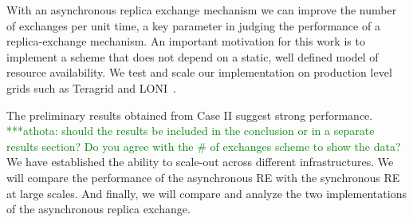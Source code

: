 \documentclass[a4paper,10pt]{article}
\newcommand{\jhanote}[1]{ {\textcolor{red} { ***shantenu: #1 }}}
\newcommand{\athotanote}[1]{ {\textcolor{green} { ***athota: #1 }}}
\newcommand{\jhanote}[1]{}
\newcommand{\athotanote}[1]{}
\begin{document}
%

With an asynchronous replica exchange mechanism we can improve the
number of exchanges per unit time, a key parameter in judging the
performance of a replica-exchange mechanism.  An important motivation
for this work is to implement a scheme that does not depend on a
static, well defined model of resource availability. We test and scale
our implementation on production level grids such as Teragrid and
LONI~\cite{LONI_web}.

 
The preliminary results obtained from Case II suggest strong
performance.
\athotanote{should the results
  be included in the conclusion or in a separate results section? Do
  you agree with the \# of exchanges scheme to show the data?}
We have established the ability to scale-out across different
infrastructures. We will compare the performance of the asynchronous
RE with the synchronous RE at large scales. And finally, we will
compare and analyze the two implementations of the asynchronous
replica exchange.


 
  
 
\end{document}
